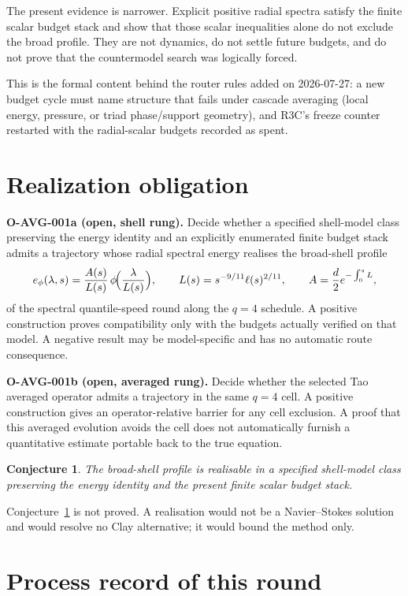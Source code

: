 \documentclass[11pt]{article}
\newtheorem{conjecture}[theorem]{Conjecture}
\theoremstyle{remark}
\begin{document}
The present evidence is narrower.  Explicit positive radial spectra
satisfy the finite scalar budget stack and show that those scalar
inequalities alone do not exclude the broad profile.  They are not
dynamics, do not settle future budgets, and do not prove that the
countermodel search was logically forced.

This is the formal content behind the router rules added on
2026-07-27: a new budget cycle must name structure that fails under
cascade averaging (local energy, pressure, or triad
phase/support geometry), and R3C's freeze counter restarted with the
radial-scalar budgets recorded as spent.

\section{Realization obligation}
\label{sec:realization}

\textbf{O-AVG-001a (open, shell rung).}  Decide whether a specified
shell-model class preserving the energy identity and an explicitly
enumerated finite budget stack admits a trajectory whose
radial spectral energy realises the broad-shell profile
\[
 e_\phi(\lambda,s)=\frac{A(s)}{L(s)}\,
 \phi\!\Bigl(\frac{\lambda}{L(s)}\Bigr),
 \qquad
 L(s)=s^{-9/11}\ell(s)^{2/11},
 \qquad
 A=\frac d2e^{-\int_0^sL},
\]
of the spectral quantile-speed round along the \(q=4\) schedule.  A
positive construction proves compatibility only with the budgets
actually verified on that model.  A negative result may be
model-specific and has no automatic route consequence.

\textbf{O-AVG-001b (open, averaged rung).}  Decide whether the selected
Tao averaged operator admits a trajectory in the same \(q=4\) cell.  A
positive construction gives an operator-relative barrier for any cell
exclusion.  A proof that this averaged evolution avoids the cell does
not automatically furnish a quantitative estimate portable back to the
true equation.

\begin{conjecture}
\label{conj:realizable}
The broad-shell profile is realisable in a specified shell-model class
preserving the energy identity and the present finite scalar budget
stack.
\end{conjecture}

Conjecture~\ref{conj:realizable} is not proved.  A realisation would
not be a Navier--Stokes solution and would resolve no Clay
alternative; it would bound the method only.

\section{Process record of this round}
\end{document}

